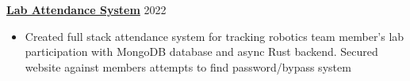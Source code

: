 \textbf{\href{https://github.com/lucamanolache/attendance}{Lab Attendance System}} \hfill 2022 \par
\begin{itemize}
	\item Created full stack attendance system for tracking robotics team member's lab participation with MongoDB database and async Rust backend. Secured website against members attempts to find password/bypass system
\end{itemize} \par

